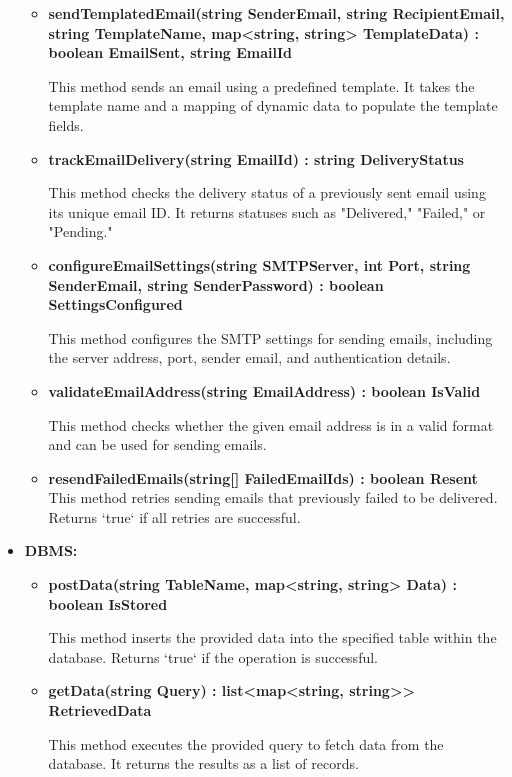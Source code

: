\begin{itemize}
\begin{itemize}
\item \textbf{sendTemplatedEmail(string SenderEmail, string RecipientEmail, string TemplateName, map<string, string> TemplateData) : boolean EmailSent, string EmailId}  

This method sends an email using a predefined template. It takes the template name and a mapping of dynamic data to populate the template fields.

\item \textbf{trackEmailDelivery(string EmailId) : string DeliveryStatus} 

This method checks the delivery status of a previously sent email using its unique email ID. It returns statuses such as "Delivered," "Failed," or "Pending."

\item \textbf{configureEmailSettings(string SMTPServer, int Port, string SenderEmail, string SenderPassword) : boolean SettingsConfigured}  

This method configures the SMTP settings for sending emails, including the server address, port, sender email, and authentication details.

\item \textbf{validateEmailAddress(string EmailAddress) : boolean IsValid}  

This method checks whether the given email address is in a valid format and can be used for sending emails.

\item \textbf{resendFailedEmails(string[] FailedEmailIds) : boolean Resent}  
This method retries sending emails that previously failed to be delivered. Returns `true` if all retries are successful.
\end{itemize}

\item \textbf{DBMS:}
\begin{itemize}
\item \textbf{postData(string TableName, map<string, string> Data) : boolean IsStored} 

This method inserts the provided data into the specified table within the database. Returns `true` if the operation is successful.

\item \textbf{getData(string Query) : list<map<string, string>> RetrievedData}  

This method executes the provided query to fetch data from the database. It returns the results as a list of records.


\end{itemize}
\end{itemize}
